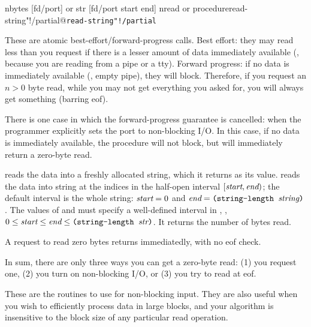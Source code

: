  {nbytes [fd/port]} {{\str} or \sharpf}
 {str [fd/port start end]} {nread or \sharpf}
        {procedure}{read-string"!/partial@\texttt{read-string"!/partial}}
\begin{desc}
%
  These are atomic best-effort/forward-progress calls. 
  Best effort: they may read less than you request if there is a
  lesser amount of data immediately available (\eg, because you
  are reading from a pipe or a tty).
  Forward progress: if no data is immediately available 
  (\eg, empty pipe), they will block.
  Therefore, if you request an $n>0$ byte read, 
  while you may not get everything you asked for, you will always get something
  (barring eof).

  There is one case in which the forward-progress guarantee is cancelled:
  when the programmer explicitly sets the port to non-blocking I/O.
  In this case, if no data is immediately available, 
  the procedure will not block, but will immediately return a zero-byte read.

   reads the data into a freshly allocated string,
  which it returns as its value.
   reads the data into string 
  at the indices in the half-open interval $[\var{start},\var{end})$;
  the default interval is the whole string: $\var{start}=0$ and
  $\var{end}=\ex{(string-length \var{string})}$.
  The values of  and  must specify a well-defined
  interval in , 
  \ie, $0 \le \var{start} \le \var{end} \le \ex{(string-length \var{str})}$.
  It returns the number of bytes read.

  A request to read zero bytes returns immediatedly, with no eof check.

  In sum, there are only three ways you can get a zero-byte read:
  (1) you request one, (2) you turn on non-blocking I/O, or (3) you
  try to read at eof.

  These are the routines to use for non-blocking input.
  They are also useful when you wish to efficiently process data
  in large blocks, and your algorithm is insensitive to the block size
  of any particular read operation.
\end{desc}


